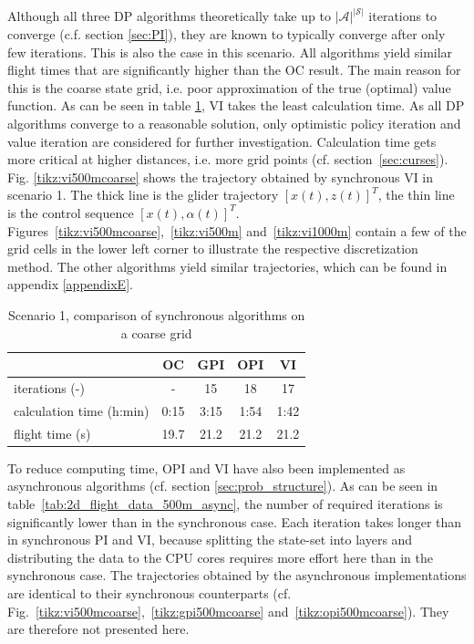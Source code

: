 Although all three DP algorithms theoretically take up to $|\mathcal{A}|^{|\mathcal{S}|}$ iterations to converge (c.f. section \ref{sec:PI}), they are known to typically converge after only few iterations. This is also the case in this scenario. All algorithms yield similar flight times that are significantly higher than the OC result. The main reason for this is the coarse state grid, i.e. poor approximation of the true (optimal) value function. As can be seen in table \ref{tab:2d_flight_data_500m}, VI takes the least calculation time. As all DP algorithms converge to a reasonable solution, only optimistic policy iteration and value iteration are considered for further investigation. Calculation time gets more critical at higher distances, i.e. more grid points (cf. section~\ref{sec:curses}). Fig. \ref{tikz:vi500mcoarse} shows the trajectory obtained by synchronous VI in scenario 1. The thick line is the glider trajectory $[x(t),z(t)]^T$, the thin line is the control sequence $[x(t),\alpha(t)]^T$. Figures~\ref{tikz:vi500mcoarse},~\ref{tikz:vi500m} and~\ref{tikz:vi1000m} contain a few of the grid cells in the lower left corner to illustrate the respective discretization method. The other algorithms yield similar trajectories, which can be found in appendix \ref{appendixE}.

\begin{table}[htb]
	\begin{center}
		\begin{tabular}{l|c c c c}
			 & OC & GPI & OPI & VI \\ \hline
			iterations (-) & - & 15 & 18 & 17 \\
			calculation time (h:min) & 0:15 & 3:15 & 1:54 & 1:42 \\
			flight time (s) & 19.7 & 21.2 & 21.2 & 21.2
		\end{tabular}
		\caption{Scenario 1, comparison of synchronous algorithms on a coarse grid}
		\label{tab:2d_flight_data_500m}
	\end{center}
\end{table}

To reduce computing time, OPI and VI have also been implemented as asynchronous algorithms (cf. section \ref{sec:prob_structure}). As can be seen in table~\ref{tab:2d_flight_data_500m_async}, the number of required iterations is significantly lower than in the synchronous case. Each iteration takes longer than in synchronous PI and VI, because splitting the state-set into layers and distributing the data to the CPU cores requires more effort here than in the synchronous case. The trajectories obtained by the asynchronous implementations are identical to their synchronous counterparts (cf. Fig.~\ref{tikz:vi500mcoarse},~\ref{tikz:gpi500mcoarse} and~\ref{tikz:opi500mcoarse}). They are therefore not presented here.

